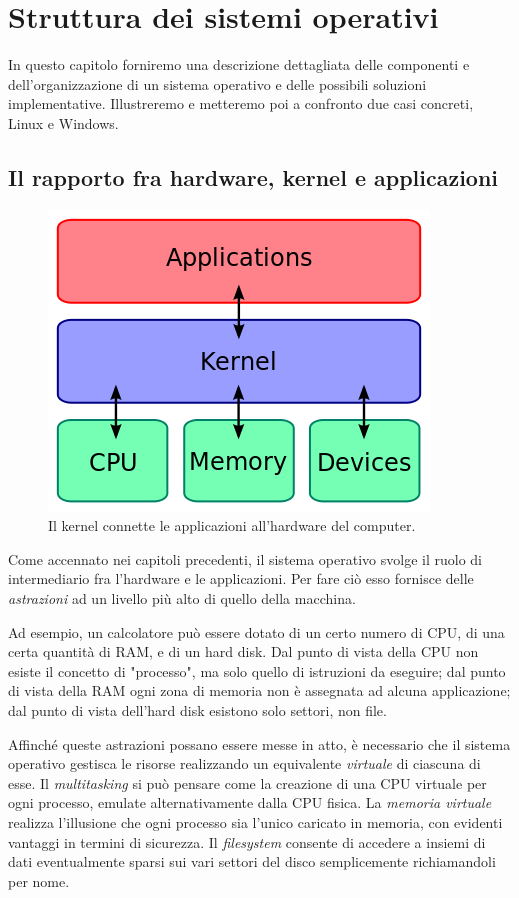 \documentclass[12pt,a4paper]{report}
\begin{document}
\chapter{Struttura dei sistemi operativi}
	In questo capitolo forniremo una descrizione dettagliata delle componenti e dell'organizzazione di un sistema operativo e
	delle possibili soluzioni implementative. Illustreremo e metteremo poi a confronto due casi concreti, Linux e Windows.
	
	\section{Il rapporto fra hardware, kernel e applicazioni}
		\begin{figure}[htbp]
		\centering
		\includegraphics[scale=0.7]{img/layout.png}
		\caption{Il kernel connette le applicazioni all'hardware del computer. \cite{WIKI_Kernel}\label{fig:layout}}
		\end{figure}
		
		Come accennato nei capitoli precedenti, il sistema operativo svolge il ruolo di intermediario fra l'hardware e
		le applicazioni.
		Per fare ciò esso fornisce delle \emph{astrazioni} ad un livello più alto di quello della macchina.
		
		Ad esempio, un calcolatore può essere dotato di un certo numero di CPU, di una certa quantità
		di RAM, e di un hard disk.
		Dal punto di vista della CPU non esiste il concetto di "processo", ma solo quello di istruzioni da eseguire;
		dal punto di vista della RAM ogni zona di memoria non è assegnata ad alcuna applicazione;
		dal punto di vista dell'hard disk esistono solo settori, non file.
		
		Affinché queste astrazioni possano essere messe in atto, è necessario che il sistema operativo
		gestisca le risorse realizzando un equivalente \emph{virtuale} di ciascuna di esse.
		Il \emph{multitasking} si può pensare come la creazione di una CPU virtuale per ogni processo, emulate
		alternativamente dalla CPU fisica.
		La \emph{memoria virtuale} realizza l'illusione che ogni processo sia l'unico caricato in memoria, con
		evidenti vantaggi in termini di sicurezza.
		Il \emph{filesystem} consente di accedere a insiemi di dati eventualmente sparsi sui vari settori
		del disco semplicemente richiamandoli per nome.
		
\end{document}
